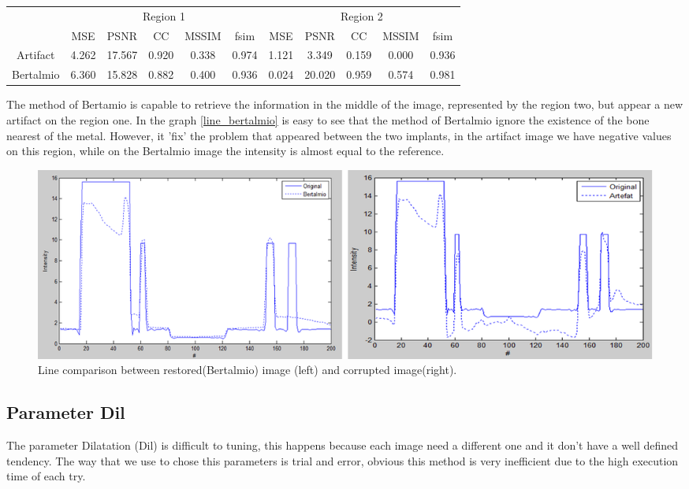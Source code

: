 \begin{adjustwidth}{-1in}{-1in}
\centering
\begin{tabular}{c|c|c|c|c|c|c|c|c|c|c|}
\cline{2-11}
& \multicolumn{5}{|c|}{Region 1} & \multicolumn{5}{|c|}{Region 2} \\
\cline{2-11}
& MSE & PSNR & CC & MSSIM & fsim  & MSE & PSNR & CC & MSSIM & fsim  \\
\hline
\multicolumn{1}{|c|}{Artifact} & 4.262	& 17.567 &0.920	&0.338	&0.974	&1.121	&3.349	&0.159	&0.000	&0.936 \\
\multicolumn{1}{|c|}{Bertalmio} & 6.360	&15.828	&0.882	&0.400	&0.936	&0.024	&20.020	&0.959	&0.574	&0.981 \\
\hline
\end{tabular}
\end{adjustwidth}
\medskip

The method of Bertamio is capable to retrieve the information in the middle of the image, represented by the region two, but appear a new artifact on the region one. In the graph \eqref{line_bertalmio} is easy to see that the method of Bertalmio ignore the existence of the bone nearest of the metal. However, it 'fix' the problem that appeared between the two implants, in the artifact image we have negative values on this region, while on the Bertalmio image the intensity is almost equal to the reference. 

\begin{figure}[H]
\centering
\includegraphics[scale=0.45]{img/line_bertalmio}
\caption{{Line comparison between restored(Bertalmio) image (left) and corrupted image(right).}}\label{line_bertalmio}
\end{figure}

\subsection{Parameter Dil}
The parameter Dilatation (Dil) is difficult to tuning, this happens because each image need a different one and it don't have a well defined tendency. The way that we use to chose this parameters is trial and error, obvious this method is very inefficient due to the high execution time of each try.

